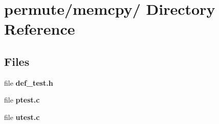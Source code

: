 \section{permute/memcpy/ Directory Reference}
\label{dir_000010}
\subsection*{Files}
\begin{CompactItemize}
\item 
file {\bf def_test.h}
\item 
file {\bf ptest.c}
\item 
file {\bf utest.c}
\end{CompactItemize}

